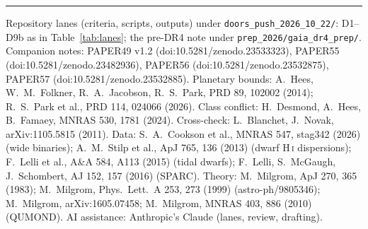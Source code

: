 \documentclass[10pt]{article}
\begin{document}
\vspace{2pt}\hrule\vspace{2pt}
{\footnotesize
Repository lanes (criteria, scripts, outputs) under \texttt{doors\_push\_2026\_10\_22/}: D1--D9b as in Table~\ref{tab:lanes}; the pre-DR4 note under \texttt{prep\_2026/gaia\_dr4\_prep/}. Companion notes: PAPER49 v1.2 (doi:10.5281/zenodo.23533323), PAPER55 (doi:10.5281/zenodo.23482936), PAPER56 (doi:10.5281/zenodo.23532875), PAPER57 (doi:10.5281/zenodo.23532885).
Planetary bounds: A.~Hees, W.~M.~Folkner, R.~A.~Jacobson, R.~S.~Park, PRD 89, 102002 (2014); R.~S.~Park et al., PRD 114, 024066 (2026). Class conflict: H.~Desmond, A.~Hees, B.~Famaey, MNRAS 530, 1781 (2024). Cross-check: L.~Blanchet, J.~Novak, arXiv:1105.5815 (2011).
Data: S.~A.~Cookson et al., MNRAS 547, stag342 (2026) (wide binaries); A.~M.~Stilp et al., ApJ 765, 136 (2013) (dwarf H\,\textsc{i} dispersions); F.~Lelli et al., A\&A 584, A113 (2015) (tidal dwarfs); F.~Lelli, S.~McGaugh, J.~Schombert, AJ 152, 157 (2016) (SPARC).
Theory: M.~Milgrom, ApJ 270, 365 (1983); M.~Milgrom, Phys.\ Lett.\ A 253, 273 (1999) (astro-ph/9805346); M.~Milgrom, arXiv:1605.07458; M.~Milgrom, MNRAS 403, 886 (2010) (QUMOND).
AI assistance: Anthropic's Claude (lanes, review, drafting).}
\end{document}
